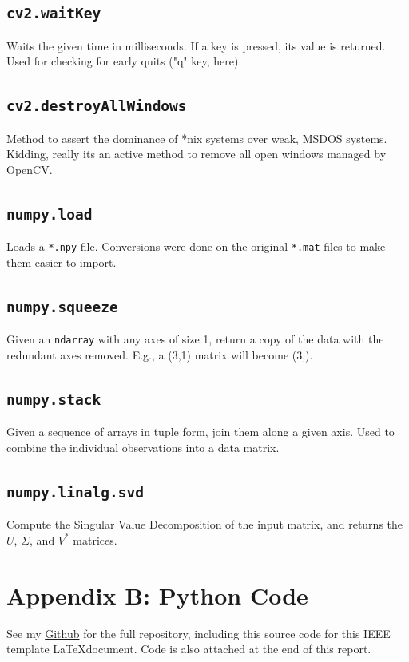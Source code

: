 \documentclass[journal]{IEEEtran}
\newcommand{\myMatrix}[1]{\bm{\mathit{#1}}}
\def\code#1{\texttt{#1}}
\begin{document}
\subsection{\code{cv2.waitKey}}
Waits the given time in milliseconds. If a key is pressed, its value is returned. Used for checking
for early quits ("q" key, here).
\subsection{\code{cv2.destroyAllWindows}}
Method to assert the dominance of *nix systems over weak, MSDOS systems. Kidding, really its an
active method to remove all open windows managed by OpenCV.

\subsection{\code{numpy.load}}
Loads a \code{*.npy} file. Conversions were done on the original \code{*.mat} files to make them
easier to import.
\subsection{\code{numpy.squeeze}}
Given an \code{ndarray} with any axes of size 1, return a copy of the data with the redundant
axes removed. E.g., a (3,1) matrix will become (3,).
\subsection{\code{numpy.stack}}
Given a sequence of arrays in tuple form, join them along a given axis. Used to combine the
individual observations into a data matrix.
\subsection{\code{numpy.linalg.svd}}
Compute the Singular Value Decomposition of the input matrix, and returns the $\myMatrix{U}$,
$\myMatrix{\Sigma}$, and $\myMatrix{V}^{*}$ matrices.

\newpage
\clearpage
\newpage
\section{Appendix B: Python Code}
See my \href{https://github.com/eric-silk/AMATH582_HW3}{Github} for the full repository, including this source code for this IEEE template \LaTeX document. Code is also attached at the end of this report.
\end{document}

